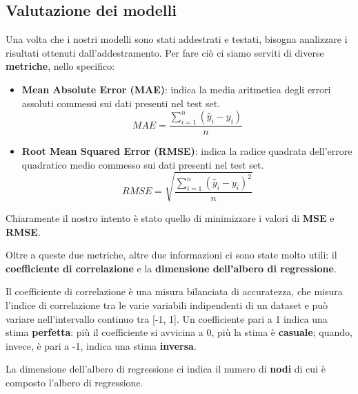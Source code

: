 \documentclass[a4paper, 11pt, oneside]{report}
\begin{document}
                \subsection{Valutazione dei modelli}
                Una volta che i nostri modelli sono stati addestrati e testati, bisogna analizzare i risultati ottenuti
                dall'addestramento. Per fare ciò ci siamo serviti di diverse \textbf{metriche}, nello specifico:
                \begin{itemize}
                    \item \textbf{Mean Absolute Error (MAE)}: indica la media aritmetica degli errori
                    assoluti commessi sui dati presenti nel test set.
                    \[
                        MAE = \frac{\sum_{i=1}^{n}(\tilde{y_i} - y_i)}{n}
                    \]
                    \item \textbf{Root Mean Squared Error (RMSE)}: indica la radice quadrata dell'errore
                    quadratico medio commesso sui dati presenti nel test set.
                    \[
                        RMSE = \sqrt {\frac{\sum_{i=1}^{n}(\tilde{y_i} - y_i)^2}{n}}
                    \]
                \end{itemize}
                \par \noindent Chiaramente il nostro intento è stato quello di minimizzare i valori di \textbf{MSE} e
                \textbf{RMSE}.
                \\
                \par \noindent Oltre a queste due metriche, altre due informazioni ci sono state molto utili: il \textbf{coefficiente
                di correlazione} e la \textbf{dimensione dell'albero di regressione}.
                \\
                \par \noindent Il coefficiente di correlazione è una misura bilanciata di accuratezza, che misura l'indice
                di correlazione tra le varie variabili indipendenti di un dataset e può variare nell'intervallo continuo tra [-1, 1].
                Un coefficiente pari a 1 indica una stima \textbf{perfetta}: più il coefficiente si avvicina a 0, più la
                stima è \textbf{casuale}; quando, invece, è pari a -1, indica una stima \textbf{inversa}.
                \\
                \par \noindent La dimensione dell'albero di regressione ci indica il numero di \textbf{nodi} di cui è
                composto l'albero di regressione.
\end{document}
